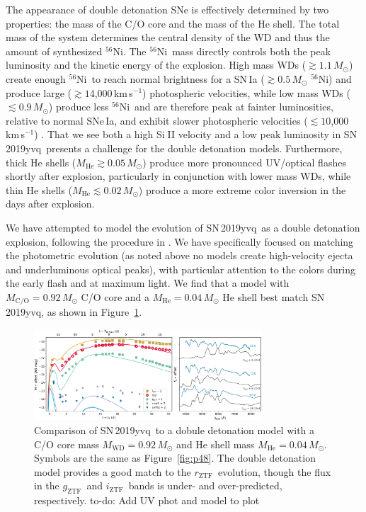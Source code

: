 \documentclass[twocolumn]{aastex63}
\def\ion#1#2{#1$\;${\footnotesize\rm{#2}}\relax}
\newcommand{\todo}[1]{{\color{magenta} to-do: {#1}}}
\newcommand{\rztf}{$r_\mathrm{ZTF}$}
\newcommand{\gztf}{$g_\mathrm{ZTF}$}
\newcommand{\iztf}{$i_\mathrm{ZTF}$}
\newcommand{\kms}{km\,s$^{-1}$}
\newcommand{\radni}{$^{56}$Ni}
\newcommand{\sn}{SN\,2019yvq}
\begin{document}
The appearance of double detonation SNe is effectively determined by two
properties: the mass of the C/O core and the mass of the He shell. The total
mass of the system determines the central density of the WD and thus the
amount of synthesized \radni. The \radni\ mass directly controls both the peak
luminosity and the kinetic energy of the explosion. High mass WDs ($\gtrsim
1.1\,M_\odot$) create enough \radni\ to reach normal brightness for a SN\,Ia
($\gtrsim 0.5\,M_\odot$ \radni) and produce large ($\gtrsim 1$4,000\,\kms)
photospheric velocities, while low mass WDs ($\lesssim 0.9\,M_\odot$) produce
less \radni\ and are therefore peak at fainter luminosities, relative to
normal SNe\,Ia, and exhibit slower photospheric velocities ($\lesssim
1$0,000\,\kms) \citep{Polin19}. That we see both a high \ion{Si}{II} velocity
and a low peak luminosity in \sn\ presents a challenge for the \citet{Polin19}
double detonation models. Furthermore, thick He shells ($M_\mathrm{He} \gtrsim
0.05\,M_\odot$) produce more pronounced UV/optical flashes shortly after
explosion, particularly in conjunction with lower mass WDs, while thin He
shells ($M_\mathrm{He} \lesssim 0.02\,M_\odot$) produce a more extreme color
inversion in the days after explosion.

We have attempted to model the evolution of \sn\ as a double detonation
explosion, following the procedure in \citet{Polin19}. We have specifically
focused on matching the photometric evolution (as noted above no models create
high-velocity ejecta and underluminous optical peaks), with particular
attention to the colors during the early flash and at maximum light. We find
that a model with $M_\mathrm{C/O} = 0.92\,M_\odot$ C/O core and a
$M_\mathrm{He} = 0.04\,M_\odot$ He shell best match \sn, as shown in
Figure~\ref{fig:double_det}.

\begin{figure}
    \centering
    \includegraphics[width=3.35in]{./figures/double_det.pdf}
    \caption{Comparison of \sn\ to a dobule detonation model with a C/O core
    mass $M_\mathrm{WD} = 0.92\,M_\odot$ and He shell mass $M_\mathrm{He} =
    0.04\,M_\odot$. Symbols are the same as Figure~\ref{fig:p48}. The double
    detonation model provides a good match to the \rztf\ evolution, though
    the flux in the \gztf\ and \iztf\ bands is under- and over-predicted,
    respectively. \todo{Add UV phot and model to plot}}
    \label{fig:double_det}
\end{figure}
\end{document}
